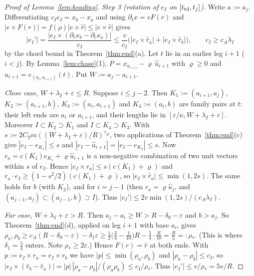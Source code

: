 \begin{proof}[Proof of Lemma~\ref{lem:heading}]
\emph{Step 3 (rotation of $e_I$ on $[t_{\mathrm{td}},t_j]$).} Write $a:=a_j$. Differentiating $c_Ie_I=x_b-x_a$ and using
$\partial_tx=vF(r)$ and $|e\times F(r)|=f(\rho)|e\times\hat r|\le|e\times\hat r|$ gives
\[
|e_I'|=\frac{|e_I\times(\partial_tx_b-\partial_tx_a)|}{c_I}\le\frac{v}{c_I}\bigl(|e_I\times\hat r_a|+|e_I\times\hat r_b|\bigr),
\qquad c_I\ge c_A\lambda_I
\]
by the chord bound in Theorem~\ref{thm:end}(a). Let $t$ lie in an earlier leg $i+1$ ($i<j$). By Lemma~\ref{lem:chase}(1),
$P=x_{a_{i+1}}-\varrho\,\hat u_{i+1}$ with $\varrho\ge0$ and $\hat u_{i+1}=e_{(a_i,a_{i+1})}(t)$. Put $W:=a_j-a_{i+1}$.

\emph{Close case, $W+\lambda_I+\varepsilon\le R$.} Suppose $i\le j-2$. Then $K_1:=(a_{i+1},a_j)$, $K_2:=(a_{i+1},b)$,
$K_3:=(a_i,a_{i+1})$ and $K_4:=(a_i,b)$ are family pairs at $t$: their left ends are $a_i$ or $a_{i+1}$, and their lengths
lie in $[\varepsilon/\kappa,W+\lambda_I+\varepsilon]$. Moreover $I\subset K_2\supset K_1$ and $I\subset K_4\supset K_3$.
With $s:=2C_Tm((W+\lambda_I+\varepsilon)/R)^{\gamma_D}$, two applications of Theorem~\ref{thm:end}(c) give
$|e_I-e_{K_1}|\le s$ and $|e_I-\hat u_{i+1}|=|e_I-e_{K_3}|\le s$. Now $r_a=c(K_1)e_{K_1}+\varrho\hat u_{i+1}$ is a
non-negative combination of two unit vectors within $s$ of $e_I$. Hence $|e_I\times r_a|\le s(c(K_1)+\varrho)$ and
$r_a\cdot e_I\ge(1-s^2/2)(c(K_1)+\varrho)$, so $|e_I\times\hat r_a|\le\min(1,2s)$. The same holds for $b$ (with $K_2$),
and for $i=j-1$ (then $r_a=\varrho\hat u_j$, and $(a_{j-1},a_j)\subset(a_{j-1},b)\supset I$). Thus
$|e_I'|\le2v\min(1,2s)/(c_A\lambda_I)$.

\emph{Far case, $W+\lambda_I+\varepsilon>R$.} Then $a_j-a_i\ge W>R-\delta_0-\varepsilon$ and $b>a_j$. So
Theorem~\ref{thm:end}(d), applied on leg $i+1$ with base $a_i$, gives
$\rho_a,\rho_b\ge c_A(R-\delta_0-\varepsilon)-\delta_1\varepsilon\ge\frac12\bigl(\frac34-\frac1{10}\bigr)R-\frac54\cdot\frac
R{10}=\frac R5=:\rho_*$. (This is where $\delta_1=\frac54$ enters. Note $\rho_*\ge2\varepsilon$.) Hence $F(r)=\hat r$ at
both ends. With $p:=e_I\times r_a=e_I\times r_b$ we have $|p|\le\min(\rho_a,\rho_b)$ and $|\rho_a-\rho_b|\le c_I$, so
$|e_I\times(\hat r_b-\hat r_a)|=|p|\,|\rho_a-\rho_b|/(\rho_a\rho_b)\le c_I/\rho_*$. Thus $|e_I'|\le v/\rho_*=5v/R$.


\end{proof}
